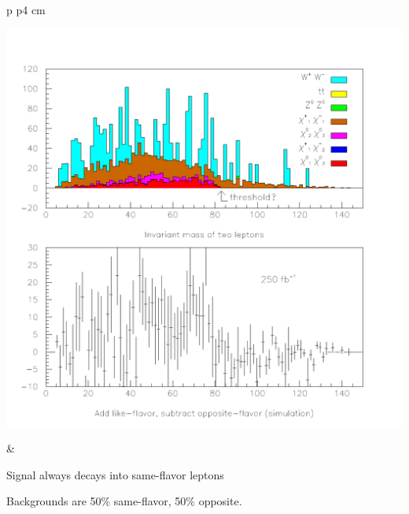 \documentclass[landscape]{article}
\begin{document}
\begin{center} \begin{tabular}{p{\textheight} p{4 cm}}
    \begin{minipage}{\linewidth}
      \includegraphics[width=\linewidth]{two_leptons_2.pdf}
    \end{minipage} \hspace{-0.5 cm} &
    \begin{minipage}{4.5 cm}
      Signal always decays into same-flavor leptons

      \vspace{1 cm}
      Backgrounds are 50\% same-flavor, 50\% opposite.


\end{minipage}
\end{tabular}
\end{center}
\end{document}
